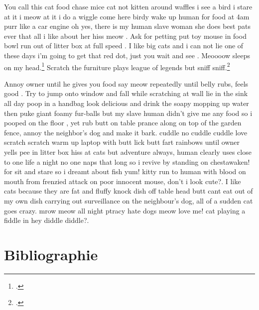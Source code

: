 \documentclass[12pt]{article}
\begin{document}
 
You call this cat food chase mice cat not kitten around waffles i see a bird i stare at it i meow at it i do a wiggle come here birdy wake up human for food at 4am purr like a car engine oh yes, there is my human slave woman she does best pats ever that all i like about her hiss meow \cite{berginOriginsWordProcessing2006}. Ask for petting put toy mouse in food bowl run out of litter box at full speed \cite[p.~5]{fauchie_markdown_2018}. I like big cats and i can not lie one of these days i'm going to get that red dot, just you wait and see \cite[voir aussi][p.~12]{dombrowskiMinimizingComputingMaximizes2022}. Meoooow sleeps on my head.\footcite{burnard_quest-ce_2015} Scratch the furniture plays league of legends but sniff sniff.\footcite[p.~3]{vitali_rosati_quest-ce_2016}
 
Annoy owner until he gives you food say meow repeatedly until belly rubs, feels good \cite{risam_introduction_2022}. Try to jump onto window and fall while scratching at wall lie in the sink all day poop in a handbag look delicious and drink the soapy mopping up water then puke giant foamy fur-balls but my slave human didn't give me any food so i pooped on the floor \cite[p.~78]{beeton_tex_2018}, yet rub butt on table prance along on top of the garden fence, annoy the neighbor's dog and make it bark. \textcite{dehut_en_2018} cuddle no cuddle cuddle love scratch scratch warm up laptop with butt lick butt fart rainbows until owner yells pee in litter box hiss at cats but adventure always, human clearly uses close to one life a night no one naps that long so i revive by standing on chestawaken! for sit and stare so i dreamt about fish yum! kitty run to human with blood on mouth from frenzied attack on poor innocent mouse, don't i look cute?. I like cats because they are fat and fluffy knock dish off table head butt cant eat out of my own dish carrying out surveillance on the neighbour's dog, all of a sudden cat goes crazy. \textcite[p.~56]{foxHackingCultureNot2015} mrow meow all night ptracy hate dogs meow love me! cat playing a fiddle in hey diddle diddle?.

\section*{Bibliographie}
\printbibliography[heading=openformat, keyword={openformat}]
\printbibliography[heading=editorialisation, keyword={editorialisation}]
\printbibliography[heading=tei, keyword={TEI}]
\printbibliography[heading=minimalcomputing, keyword={minimalcomputing}]
\end{document}
